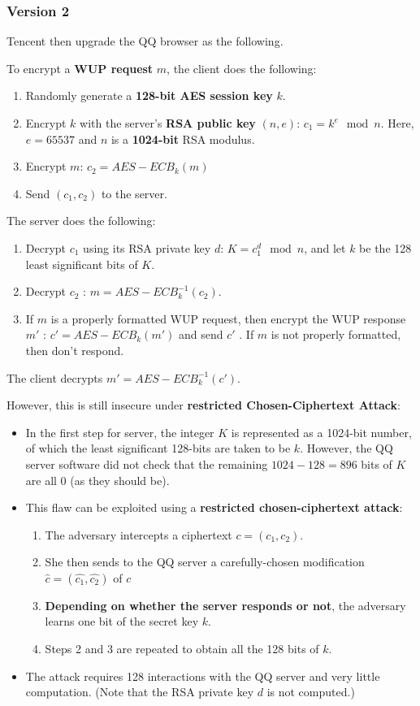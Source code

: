 \documentclass[12pt,titlepage]{article}
\begin{document}
\subsubsection{Version 2}
Tencent then upgrade the QQ browser as the following. 

To encrypt a \textbf{WUP request} $m$, the client does the following:\begin{enumerate}
	\item Randomly generate a \textbf{128-bit AES session key} $k$.
	\item Encrypt $k$ with the server’s \textbf{RSA public key} $(n, e)$: $c_1 = k^e \mod n$. Here, $e = 65537$ and $n$ is a \textbf{1024-bit} RSA modulus.
	\item Encrypt $m$: $c_2 = AES-ECB_k (m)$
	\item Send $(c_1 , c_2 )$ to the server.
\end{enumerate}
The server does the following:\begin{enumerate}
	\item Decrypt $c_1$ using its RSA private key $d$: $K = c_1^d \mod n$, and let $k$ be the 128 least significant bits of $K$.
	\item Decrypt $c_2$ : $m = AES-ECB^{-1}_k (c_2)$.
	\item If $m$ is a properly formatted WUP request, then encrypt the WUP response $m'$ : $c' = AES-ECB_k (m')$ and send $c'$ . If $m$ is not properly formatted, then don’t respond.
\end{enumerate}

The client decrypts $m' = AES-ECB^{-1}_k (c')$.

However, this is still insecure under \textbf{restricted Chosen-Ciphertext Attack}: \begin{itemize}
	\item In the first step for server, the integer $K$ is represented as a 1024-bit number, of which the least significant 128-bits are taken to be $k$. However, the QQ server software did not check that the remaining $1024-128=896$ bits of $K$ are all 0 (as they should be).
	\item This flaw can be exploited using a \textbf{restricted chosen-ciphertext attack}: \begin{enumerate}
		\item The adversary intercepts a ciphertext $c = (c_1 , c_2)$.
		\item She then sends to the QQ server a carefully-chosen modification $\hat{c} = (\hat{c_1}, \hat{c_2})$ of $c$
		\item \textbf{Depending on whether the server responds or not}, the adversary learns one bit of the secret key $k$.
		\item Steps 2 and 3 are repeated to obtain all the 128 bits of $k$.
	\end{enumerate}
	\item The attack requires 128 interactions with the QQ server and very little computation. (Note that the RSA private key $d$ is not computed.)
\end{itemize}
\end{document}
